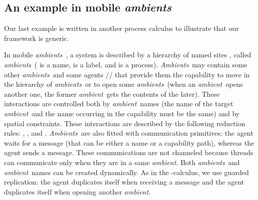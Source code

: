 \documentclass{article}
\newcommand{\ambient}{\emph{ambient}}
\newcommand{\ambients}{\emph{ambients}}
\newcommand{\Ambients}{\emph{Ambients}}
\begin{document}
\subsection{An example in mobile \ambients}

Our last example is written in another process calculus to illustrate that our framework is generic.

In mobile \ambients\ \cite{ambients}, 
a system is described by a hierarchy of named sites , called \ambients\ ( is a name,  is a label, and  is a process).
\Ambients\ may contain some other \ambients\  and some agents // that provide them the capability to move in the hierarchy of \ambients\ or to open  some \ambients\ 
 (when an \ambient\ opens another one, the former \ambient\ gets the contents of the later). These interactions are controlled both by \ambient\ names (the name of the  target \ambient\ and the name occurring in the capability must be the same) and by spatial constraints. 
These interactions are described by the following reduction rules:
 ,  , and 
.
\Ambients\ are also fitted with communication primitives: the agent   waits for a message (that can be either a name or a capability path), whereas the agent  sends a message. 
These communications are not channeled because 
threads can communicate only when they are in a same \ambient.
Both \ambients\ and \ambient\ names can be created dynamically. As in the -calculus, we use guarded replication: the agent  duplicates itself when receiving a message and the agent  duplicates itself when opening another \ambient.
\end{document}
